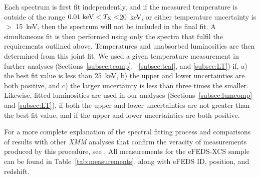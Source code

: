 \documentclass[fleqn,usenatbib]{mnras}
\begin{document}

Each spectrum is first fit independently, and if the measured temperature is outside of the range $0.01~{\rm keV} < T_{\rm{X}} < $20~keV, or either temperature uncertainty is $>$ 15~keV, then the spectrum will not be included in the final fit. A simultaneous fit is then performed using only the spectra that fulfil the requirements outlined above. Temperatures and unabsorbed luminosities are then determined from this joint fit. We used a given temperature measurement in further analyses (Sections~\ref{subsec:tcomp},  ~\ref{subsec:tcal}, and \ref{subsec:LT}) if, a) the best fit value is less than 25~keV, b) the upper and lower uncertainties are both positive, and c) the larger uncertainty is less than three times the smaller. Likewise, fitted luminosities are used in our analyses (Sections~\ref{subsec:lumcomp} and \ref{subsec:LT}), if both the upper and lower uncertainties are not greater than the best fit value, and if the upper and lower uncertainties are both positive. 

For a more complete explanation of the spectral fitting process and comparisons of results with other {\em XMM} analyses that confirm the veracity of measurements produced by this procedure, see \cite{xcsmassmethod}. All measurements for the eFEDS-XCS sample can be found in Table~\ref{tab:measurements}, along with eFEDS ID, position, and redshift.
\end{document}
